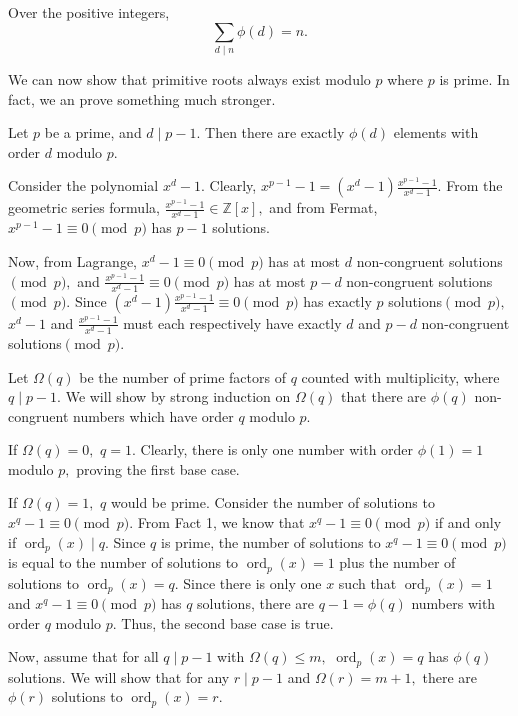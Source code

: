 \documentclass[mast]{lucky}
\begin{document}
\begin{fact}
Over the positive integers,
$$\sum_{d \mid n} \phi(d) = n.$$
\end{fact}
We can now show that primitive roots always exist modulo $p$ where $p$ is prime. In fact, we an prove something much stronger.

\begin{theo}
Let $p$ be a prime, and $d \mid p-1.$ Then there are exactly $\phi(d)$ elements with order $d$ modulo $p.$
\end{theo}

\begin{pro}
Consider the polynomial $x^d - 1.$ Clearly, $x^{p-1} - 1 = (x^d - 1) \frac{x^{p-1}-1}{x^d-1}.$ From the geometric series formula, $\frac{x^{p-1}-1}{x^d-1} \in \mathbb{Z}[x],$ and from Fermat, $x^{p-1}-1 \equiv 0 \pmod{p}$ has $p-1$ solutions.

Now, from Lagrange, $x^d - 1 \equiv 0 \pmod{p}$ has at most $d$ non-congruent solutions$\pmod{p},$ and $\frac{x^{p-1}-1}{x^d-1} \equiv 0 \pmod{p}$ has at most $p - d$ non-congruent solutions$\pmod{p}.$ Since $(x^d - 1) \frac{x^{p-1}-1}{x^d-1} \equiv 0 \pmod{p}$ has exactly $p$ solutions$\pmod{p},$ $x^d-1$ and $\frac{x^{p-1}-1}{x^d-1}$ must each respectively have exactly $d$ and $p-d$ non-congruent solutions$\pmod{p}.$

Let $\Omega(q)$ be the number of prime factors of $q$ counted with multiplicity, where $q \mid p-1.$ We will show by strong induction on $\Omega(q)$ that there are $\phi(q)$ non-congruent numbers which have order $q$ modulo $p.$

If $\Omega(q) = 0,$ $q = 1.$ Clearly, there is only one number with order $\phi(1) = 1$ modulo $p,$ proving the first base case.

If $\Omega(q) = 1,$ $q$ would be prime. Consider the number of solutions to $x^q - 1 \equiv 0 \pmod{p}.$ From Fact 1, we know that $x^q - 1 \equiv 0 \pmod{p}$ if and only if $\operatorname{ord}_p(x) \mid q.$ Since $q$ is prime, the number of solutions to $x^q - 1 \equiv 0 \pmod{p}$ is equal to the number of solutions to $\operatorname{ord}_p(x) = 1$ plus the number of solutions to $\operatorname{ord}_p(x) = q.$ Since there is only one $x$ such that $\operatorname{ord}_p(x) = 1$ and $x^q - 1 \equiv 0 \pmod{p}$ has $q$ solutions, there are $q-1 = \phi(q)$ numbers with order $q$ modulo $p.$ Thus, the second base case is true.

Now, assume that for all $q \mid p-1$ with $\Omega(q) \le m,$ $\operatorname{ord}_p(x) = q$ has $\phi(q)$ solutions. We will show that for any $r \mid p-1$ and $\Omega(r) = m+1,$ there are $\phi(r)$ solutions to $\operatorname{ord}_p(x) = r.$


\end{pro}
\end{document}
